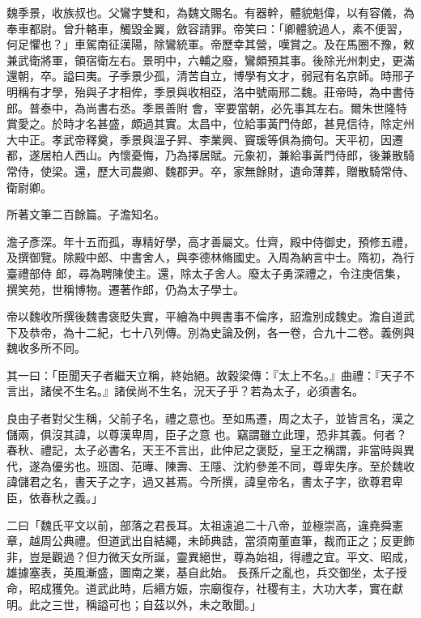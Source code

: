 \begin{pinyinscope}
 魏季景，收族叔也。父鸞字雙和，為魏文賜名。有器幹，體貌魁偉，以有容儀，為奉車都尉。曾升輅車，觸毀金翼，斂容請罪。帝笑曰：「卿體貌過人，素不便習，何足懼也？」車駕南征漢陽，除鸞統軍。帝歷幸其營，嘆賞之。及在馬圈不豫，敕兼武衛將軍，領宿衛左右。景明中，六輔之廢，鸞頗預其事。後除光州刺史，更滿還朝，卒。謚曰夷。子季景少孤，清苦自立，博學有文才，弱冠有名京師。時邢子明稱有才學，殆與子才相侔，季景與收相亞，洛中號兩邢二魏。莊帝時，為中書侍郎。普泰中，為尚書右丞。季景善附
 會，宰要當朝，必先事其左右。爾朱世隆特賞愛之。於時才名甚盛，頗過其實。太昌中，位給事黃門侍郎，甚見信待，除定州大中正。孝武帝釋奠，季景與溫子昇、李業興、竇瑗等俱為摘句。天平初，因遷都，遂居柏人西山。內懷憂悔，乃為擇居賦。元象初，兼給事黃門侍郎，後兼散騎常侍，使梁。還，歷大司農卿、魏郡尹。卒，家無餘財，遺命薄葬，贈散騎常侍、衛尉卿。



 所著文筆二百餘篇。子澹知名。



 澹子彥深。年十五而孤，專精好學，高才善屬文。仕齊，殿中侍御史，預修五禮，及撰御覽。除殿中郎、中書舍人，與李德林脩國史。入周為納言中士。隋初，為行臺禮部侍
 郎，尋為聘陳使主。還，除太子舍人。廢太子勇深禮之，令注庚信集，撰笑苑，世稱博物。遷著作郎，仍為太子學士。



 帝以魏收所撰後魏書褒貶失實，平繪為中興書事不倫序，詔澹別成魏史。澹自道武下及恭帝，為十二紀，七十八列傳。別為史論及例，各一卷，合九十二卷。義例與魏收多所不同。



 其一曰：「臣聞天子者繼天立稱，終始絕。故穀梁傳：『太上不名。』曲禮：『天子不言出，諸侯不生名。』諸侯尚不生名，況天子乎？若為太子，必須書名。



 良由子者對父生稱，父前子名，禮之意也。至如馬遷，周之太子，並皆言名，漢之儲兩，俱沒其諱，以尊漢卑周，臣子之意
 也。竊謂雖立此理，恐非其義。何者？春秋、禮記，太子必書名，天王不言出，此仲尼之褒貶，皇王之稱謂，非當時與異代，遂為優劣也。班固、范曄、陳壽、王隱、沈約參差不同，尊卑失序。至於魏收諱儲君之名，書天子之字，過又甚焉。今所撰，諱皇帝名，書太子字，欲尊君卑臣，依春秋之義。」



 二曰「魏氏平文以前，部落之君長耳。太祖遠追二十八帝，並極崇高，違堯舜憲章，越周公典禮。但道武出自結繩，未師典誥，當須南董直筆，裁而正之；反更飾非，豈是觀過？但力微天女所誕，靈異絕世，尊為始祖，得禮之宜。平文、昭成，雄據塞表，英風漸盛，圖南之業，基自此始。
 長孫斤之亂也，兵交御坐，太子授命，昭成獲免。道武此時，后緡方娠，宗廟復存，社稷有主，大功大孝，實在獻明。此之三世，稱謚可也；自茲以外，未之敢聞。」




\end{pinyinscope}
